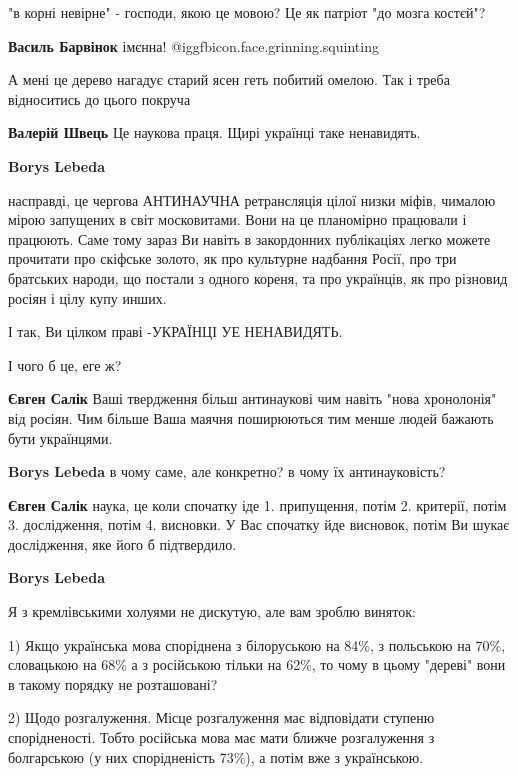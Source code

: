 \begin{itemize}
"в корні невірне" - господи, якою це мовою? Це як патріот "до мозга костєй"?

\begin{itemize} %
\textbf{Василь Барвінок} імєнна!  @igg{fbicon.face.grinning.squinting} 
\end{itemize} %

А мені це дерево нагадує старий ясен геть побитий омелою. Так і треба
відноситись до цього покруча

\begin{itemize} %
\textbf{Валерій Швець} Це наукова праця. Щирі українці таке ненавидять.

\begin{itemize} %
\textbf{Borys Lebeda} 

насправді, це чергова АНТИНАУЧНА ретрансляція цілої низки міфів, чималою мірою
запущених в світ московитами. Вони на це планомірно працювали і працюють. Саме
тому зараз Ви навіть в закордонних публікаціях легко можете прочитати про
скіфське золото, як про культурне надбання Росії, про три братських народи, що
постали з одного кореня, та про українців, як про різновид росіян і цілу купу
инших.

І так, Ви цілком праві -УКРАЇНЦІ УЕ НЕНАВИДЯТЬ.

І чого б це, еге ж?

\textbf{Євген Салік} Ваші твердження більш антинаукові чим навіть "нова хронолонія" від росіян. Чим більше Ваша маячня поширюються тим менше людей бажають бути українцями.

\textbf{Borys Lebeda} в чому саме, але конкретно? в чому їх антинауковість?

\textbf{Євген Салік} наука, це коли спочатку іде 1. припущення, потім 2. критерії, потім 3. дослідження, потім 4. висновки. У Вас спочатку йде висновок, потім Ви шукає дослідження, яке його б підтвердило.

\textbf{Borys Lebeda} 

Я з кремлівськими холуями не дискутую, але вам зроблю виняток:

1) Якщо українська мова споріднена з білоруською на 84\%, з польською на 70\%,
словацькою на 68\% а з російською тільки на 62\%, то чому в цьому "дереві" вони в
такому порядку не розташовані?

2) Щодо розгалуження. Місце розгалуження має відповідати ступеню спорідненості.
Тобто російська мова має мати ближче розгалуження з болгарською (у них
спорідненість 73\%), а потім вже з українською.


\end{itemize}
\end{itemize}
\end{itemize}
